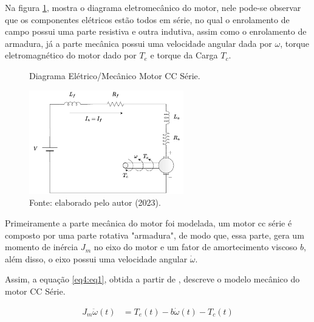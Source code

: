 Na figura \ref{fig4:image_03}, mostra o diagrama eletromecânico do motor, nele pode-se observar que os componentes elétricos estão todos em série, no qual o enrolamento de campo possui uma parte resistiva e outra indutiva, assim como o enrolamento de armadura, já a parte mecânica possui uma velocidade angular dada por $\omega$, torque eletromagnético do motor dado por $T_e$ e torque da Carga $T_c$.


\begin{figure}[!h]
	\centering
	\caption{Diagrama Elétrico/Mecânico Motor CC Série.}
	\includegraphics[width=0.6\textwidth]{Capitulos/2_aeropendulo/4_figuras/diagrama_motor_cc.pdf}
	\caption*{Fonte: elaborado pelo autor (2023).}
	\label{fig4:image_03}
\end{figure}




Primeiramente a parte mecânica do motor foi modelada, um motor cc série é composto por uma parte rotativa "armadura", de modo que, essa parte, gera um momento de inércia $J_m$ no eixo do motor e um fator de amortecimento viscoso $b$, além disso, o eixo possui uma velocidade angular $\dot{\omega}$.

Assim, a equação \ref{eq4:eq1}, obtida a partir de \cite{jesus}, descreve o modelo mecânico do motor CC Série.

\begin{align}
	J_m\ddot{\omega}(t) &= T_e(t) - b\dot{\omega}(t) - T_c(t) \label{eq4:eq1}
\end{align}


